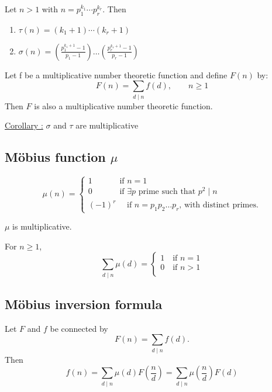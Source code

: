 \documentclass{report}
\begin{document}
\begin{thm} Let $n>1$ with $n=p_1^{k_1} \cdots p_r^{k_r}$. Then \\
	\begin{enumerate}
		\item $\tau(n)=(k_1+1) \cdots (k_r+1)$
		\item $\sigma(n)=(\frac{p_1^{k_1+1}-1}{p_1-1})\dots(\frac{p_r^{k_r+1}-1}{p_r-1})$
	\end{enumerate}
\end{thm}

\begin{thm} Let f be a multiplicative number theoretic function and define $F(n)$ by:
	\[F(n)= \sum_{d\mid n} f(d), \qquad n \geq 1 \]
	Then $F$ is also a multiplicative number theoretic function.
\end{thm}

\underline{Corollary :} $\sigma$ and $\tau$ are multiplicative\\

\subsection*{M\"{o}bius function $\mu$}
	\[ \mu(n)= 	\left \{
	\begin{array}{lcl}
	1 \quad \qquad\text{ if } n=1\\
	0 \quad \qquad \text{ if } \exists p \text{ prime such that } p^2 \mid n\\
	(-1)^r \quad \text{ if }n=p_1p_2 \dots p_r \text{,  with distinct primes.}
	\end{array}
	\right.
	\]
\begin{thm}
	$\mu$ is multiplicative.
	\end{thm}

\begin{thm}
	For $n\geq1$,
	\[ \sum_{d \mid n} \mu(d) = \left \{
	\begin{array}{lcl}
	1 \quad \text{if } n=1\\
	0 \quad \text{if }n>1\\
	\end{array}
	\right.
	\]
	\end{thm}
\subsection*{M\"{o}bius inversion formula}
Let $F$ and $f$ be connected by \[F(n)=\sum_{d \mid n} f(d).\]
Then 
\[ f(n)=\sum_{d\mid n} \mu(d) F(\frac{n}{d}) = \sum_{d \mid n} \mu(\frac{n}{d}) F(d)\]
	
\end{document}

